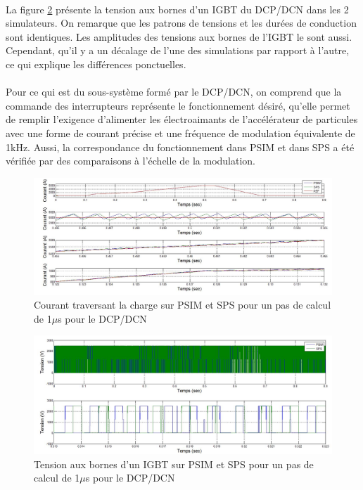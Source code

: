\paragraph{} La figure \ref{DC_IG_ten_1} présente la tension aux bornes d'un IGBT du DCP/DCN dans les 2 simulateurs. On remarque que les patrons de tensions et les durées de conduction sont identiques. Les amplitudes des tensions aux bornes de l'IGBT le sont aussi. Cependant, qu'il y a un décalage de l'une des simulations par rapport à l'autre, ce qui explique les différences ponctuelles. 

\paragraph{}Pour ce qui est du sous-système formé par le DCP/DCN, on comprend que la commande des interrupteurs représente le fonctionnement désiré, qu'elle permet de remplir l'exigence d'alimenter les électroaimants de l'accélérateur de particules avec une forme de courant précise et une fréquence de modulation équivalente de 1kHz. Aussi, la correspondance du fonctionnement dans PSIM et dans SPS a été vérifiée par des comparaisons à l'échelle de la modulation. 

\begin{figure}[htb]
\centering
\includegraphics[scale=0.5]{fig/DCPDCN/DCPCourantCharge1u.jpg}
\caption{Courant traversant la charge sur PSIM et SPS pour un pas de calcul de 1$\mu$s pour le DCP/DCN}
\label{DC_ch_cou_1}
\end{figure}

\begin{figure}[htb]
\centering
\includegraphics[scale=0.5]{fig/DCPDCN/DCPTensionIGBT1u.jpg}
\caption{Tension aux bornes d'un IGBT sur PSIM et SPS pour un pas de calcul de 1$\mu$s pour le DCP/DCN}
\label{DC_IG_ten_1}
\end{figure}

